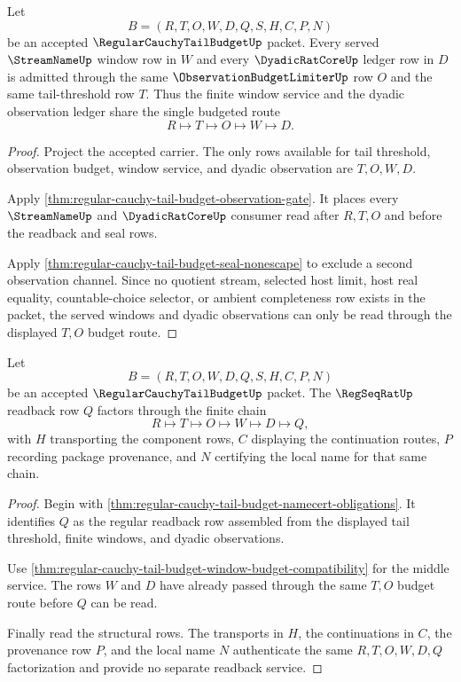 \begin{theorem}
\label{thm:regular-cauchy-tail-budget-window-budget-compatibility}
Let
$$
B=(R,T,O,W,D,Q,S,H,C,P,N)
$$
be an accepted $\RegularCauchyTailBudgetUp$ packet. Every served $\StreamNameUp$ window row in $W$ and every $\DyadicRatCoreUp$ ledger row in $D$ is admitted through the same $\ObservationBudgetLimiterUp$ row $O$ and the same tail-threshold row $T$. Thus the finite window service and the dyadic observation ledger share the single budgeted route
$$
R \longmapsto T \longmapsto O \longmapsto W \longmapsto D.
$$
\end{theorem}
\begin{proof}
Project the accepted carrier. The only rows available for tail threshold, observation budget, window service, and dyadic observation are $T,O,W,D$.

Apply \autoref{thm:regular-cauchy-tail-budget-observation-gate}. It places every $\StreamNameUp$ and $\DyadicRatCoreUp$ consumer read after $R,T,O$ and before the readback and seal rows.

Apply \autoref{thm:regular-cauchy-tail-budget-seal-nonescape} to exclude a second observation channel. Since no quotient stream, selected host limit, host real equality, countable-choice selector, or ambient completeness row exists in the packet, the served windows and dyadic observations can only be read through the displayed $T,O$ budget route.
\end{proof}

\begin{theorem}
\label{thm:regular-cauchy-tail-budget-readback-factorization}
Let
$$
B=(R,T,O,W,D,Q,S,H,C,P,N)
$$
be an accepted $\RegularCauchyTailBudgetUp$ packet. The $\RegSeqRatUp$ readback row $Q$ factors through the finite chain
$$
R \longmapsto T \longmapsto O \longmapsto W \longmapsto D \longmapsto Q,
$$
with $H$ transporting the component rows, $C$ displaying the continuation routes, $P$ recording package provenance, and $N$ certifying the local name for that same chain.
\end{theorem}
\begin{proof}
Begin with \autoref{thm:regular-cauchy-tail-budget-namecert-obligations}. It identifies $Q$ as the regular readback row assembled from the displayed tail threshold, finite windows, and dyadic observations.

Use \autoref{thm:regular-cauchy-tail-budget-window-budget-compatibility} for the middle service. The rows $W$ and $D$ have already passed through the same $T,O$ budget route before $Q$ can be read.

Finally read the structural rows. The transports in $H$, the continuations in $C$, the provenance row $P$, and the local name $N$ authenticate the same $R,T,O,W,D,Q$ factorization and provide no separate readback service.
\end{proof}


